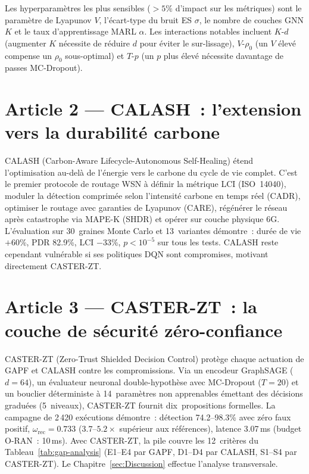 Les hyperparamètres les plus sensibles ($>5\%$ d'impact sur les métriques) sont le paramètre de Lyapunov $V$, l'écart-type du bruit ES $\sigma$, le nombre de couches GNN $K$ et le taux d'apprentissage MARL $\alpha$. Les interactions notables incluent $K$-$d$ (augmenter $K$ nécessite de réduire $d$ pour éviter le sur-lissage), $V$-$\rho_0$ (un $V$ élevé compense un $\rho_0$ sous-optimal) et $T$-$p$ (un $p$ plus élevé nécessite davantage de passes MC-Dropout).


\section{Article 2 --- CALASH~: l'extension vers la durabilité carbone}\label{sec:demarche-art2}

CALASH (Carbon-Aware Lifecycle-Autonomous Self-Healing) étend l'optimisation au-delà de l'énergie vers le carbone du cycle de vie complet. C'est le premier protocole de routage WSN à définir la métrique LCI (ISO~14040), moduler la détection comprimée selon l'intensité carbone en temps réel (CADR), optimiser le routage avec garanties de Lyapunov (CARE), régénérer le réseau après catastrophe via MAPE-K (SHDR) et opérer sur couche physique 6G. L'évaluation sur 30~graines Monte Carlo et 13~variantes démontre~: durée de vie $+$60\%, PDR 82.9\%, LCI $-$33\%, $p < 10^{-5}$ sur tous les tests. CALASH reste cependant vulnérable si ses politiques DQN sont compromises, motivant directement CASTER-ZT.


\section{Article 3 --- CASTER-ZT~: la couche de sécurité zéro-confiance}\label{sec:demarche-art3}

CASTER-ZT (Zero-Trust Shielded Decision Control) protège chaque actuation de GAPF et CALASH contre les compromissions. Via un encodeur GraphSAGE ($d = 64$), un évaluateur neuronal double-hypothèse avec MC-Dropout ($T = 20$) et un bouclier déterministe à 14~paramètres non apprenables émettant des décisions graduées (5~niveaux), CASTER-ZT fournit dix~propositions formelles. La campagne de 2\,420 exécutions démontre~: détection 74.2--98.3\% avec zéro faux positif, $\omega_{\text{rec}} = 0.733$ ($3.7$--$5.2\times$ supérieur aux références), latence 3.07\,ms (budget O-RAN~: 10\,ms). Avec CASTER-ZT, la pile couvre les 12~critères du Tableau~\ref{tab:gap-analysis} (E1--E4 par GAPF, D1--D4 par CALASH, S1--S4 par CASTER-ZT). Le Chapitre~\ref{sec:Discussion} effectue l'analyse transversale.


